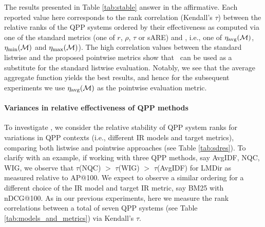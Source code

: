 The results presented in Table \ref{tab:stable} answer  in the affirmative. Each reported value here corresponds to the rank correlation (Kendall's $\tau$) between the relative ranks of the QPP systems ordered by their effectiveness as computed via one of the standard metrics (one of $r$, $\rho$, $\tau$ or sARE) and \proposed, i.e., one of $\eta_\text{avg}(\mathcal{M})$, $\eta_\text{min}(\mathcal{M})$ and $\eta_\text{max}(\mathcal{M})$). The high correlation values between the standard listwise and the proposed pointwise metrics show that \proposed~can be used as a substitute for the standard listwise evaluation. Notably, we see that the average aggregate function yields the best results, and hence for the subsequent experiments we use $\eta_\text{avg}(\mathcal{M})$ as the pointwise evaluation metric.

\paragraph{Variances in relative effectiveness of QPP methods}

To investigate , we consider the relative stability of QPP system ranks for variations in QPP contexts (i.e., different IR models and target metrics), comparing both listwise and pointwise approaches (see Table \ref{tab:sdres}). To clarify with an example, if working with three QPP methods, say AvgIDF, NQC, WIG, we observe that $\tau$(NQC) $>$ $\tau$(WIG) $>$ $\tau$(AvgIDF) for LMDir as measured relative to AP@100. We expect to observe a similar ordering for a different choice of the IR model and target IR metric, say BM25 with nDCG@100. As in our previous experiments, here we measure the rank correlations between a total of seven QPP systems (see Table \ref{tab:models_and_metrics}) via Kendall's $\tau$.